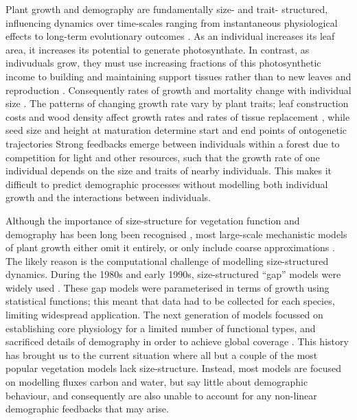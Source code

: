 \documentclass[a4paper,11pt]{article}
\begin{document}
Plant growth and demography are fundamentally size- and trait-
structured, influencing dynamics over time-scales ranging from
instantaneous physiological effects to long-term evolutionary outcomes
\citep{Harper-1977, Westoby-2002}. As an individual increases its leaf
area, it increases its potential to generate photosynthate.  In
contrast, as indivuduals grow, they must use increasing fractions of
this photosynthetic income to building and maintaining support tissues
rather than to new leaves \citep{Givnish-1988, Enquist-2007} and
reproduction \citep{Thomas-2011}. Consequently rates of growth and
mortality change with individual size \citep{Muller-2006, Thomas-2011,
  Ruger-2011, Wright-2010}.
%
The patterns of changing growth rate vary by plant traits; leaf
construction costs and wood density affect growth rates and rates of
tissue replacement \citep{Wright-2010}, while seed size and height at
maturation determine start and end points of ontogenetic trajectories
\citep{Westoby-2002}
%
Strong feedbacks emerge between individuals within a forest due to
competition for light and other resources, such that the growth rate
of one individual depends on the size and traits of nearby
individuals.  This makes it difficult to predict demographic processes
without modelling both individual growth and the interactions between
individuals.

Although the importance of size-structure for vegetation function and
demography has been long been recognised
\citep[e.g.,][]{Harper-1977, Shugart-1980, Hara-1984},
most large-scale mechanistic models of plant growth either omit it
entirely, or only include coarse approximations
\citep{Cramer-2001, Dekauwe-2014, Kelley-2013, Sitch-2003}. The likely
reason is the computational
challenge of modelling size-structured dynamics. 
During the 1980s and
early 1990s, size-structured ``gap'' models were widely used
\citep[e.g.][]{Huston-1987, Shugart-1980}. These gap models were
parameterised in terms of growth using statistical functions; this meant 
that data had to be collected for each species, limiting widespread application. 
The next generation of models focussed on establishing core physiology for 
a limited number of functional types, and
sacrificed details of demography in order to achieve global coverage
\citep{Haxeltine-1996,Woodward-1995}. This history has brought us to the
current situation where all but a couple
\citep[e.g.][]{Moorcroft-2001, Smith-2014} of the most popular vegetation
models lack size-structure. Instead, most models
are focused on modelling fluxes carbon and water, but say little about
demographic behaviour, and consequently are also unable to account for
any non-linear demographic feedbacks that may arise.
\end{document}

